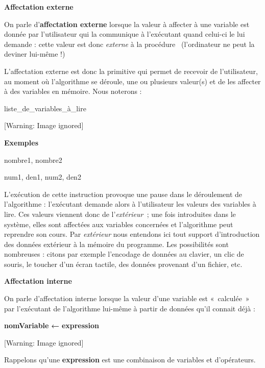 {\sffamily\bfseries
Affectation externe }

{
On parle d’\textbf{affectation externe} lorsque la valeur à affecter à
une variable est donnée par l’utilisateur qui la communique à
l’exécutant quand celui-ci le lui demande : cette valeur est donc
\textit{externe} à la procédure \ (l’ordinateur ne peut la deviner
lui-même !)}

{
L’affectation externe est donc la primitive qui permet de recevoir de
l’utilisateur, au moment où l'algorithme se déroule,
une ou plusieurs valeur(s) et de les affecter à des variables en
mémoire. Nous noterons :}

{\sffamily
{} liste\_de\_variables\_à\_lire}

\begin{center}
 [Warning: Image ignored] %

\end{center}
{\bfseries
Exemples}

{\sffamily
{} nombre1, nombre2}

{\sffamily
{} num1, den1, num2, den2}

{
{L’exécution de }cette instruction provoque une
pause dans le déroulement de l’algorithme : l’exécutant demande alors à
l’utilisateur les valeurs des variables à lire. Ces valeurs viennent
donc de l’\textit{extérieur~}; une fois introduites dans le système,
elles sont affectées aux variables concernées et l’algorithme peut
reprendre son cours. Par \textit{extérieur} nous entendons ici tout
support d’introduction des données extérieur à la mémoire du programme.
Les possibilités sont nombreuses : citons par exemple l’encodage de
données au clavier, un clic de souris, le toucher d'un
écran tactile, des données provenant d’un fichier, etc.}

{\sffamily\bfseries
Affectation interne }

{
On parle d’affectation interne lorsque la valeur d’une variable est
«~calculée~» par l’exécutant de l’algorithme lui-même à partir de
données qu’il connait déjà :}

{\sffamily
\textbf{nomVariable }{\textbf{←}}\textbf{
expression}}

\begin{center}
 [Warning: Image ignored] %

\end{center}
{
Rappelons qu’une \textbf{expression} est une combinaison de variables et
d’opérateurs. }

